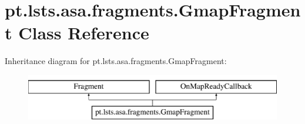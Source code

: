 \hypertarget{classpt_1_1lsts_1_1asa_1_1fragments_1_1GmapFragment}{}\section{pt.\+lsts.\+asa.\+fragments.\+Gmap\+Fragment Class Reference}
\label{classpt_1_1lsts_1_1asa_1_1fragments_1_1GmapFragment}
Inheritance diagram for pt.\+lsts.\+asa.\+fragments.\+Gmap\+Fragment\+:\begin{figure}[H]
\begin{center}
\leavevmode
\includegraphics[height=2.000000cm]{classpt_1_1lsts_1_1asa_1_1fragments_1_1GmapFragment}
\end{center}
\end{figure}

